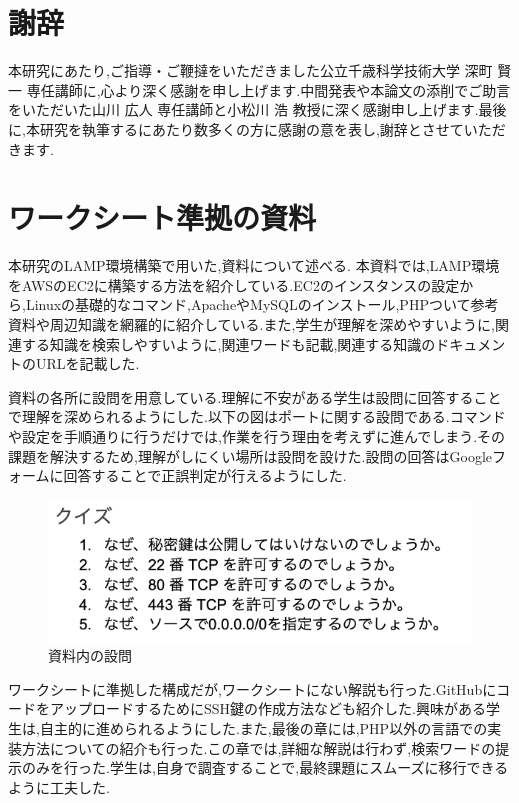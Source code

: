 \documentclass[11pt, a4paper]{jreport}
\begin{document}
\chapter*{謝辞}


本研究にあたり,ご指導・ご鞭撻をいただきました公立千歳科学技術大学 深町 賢一 専任講師に,心より深く感謝を申し上げます.中間発表や本論文の添削でご助言をいただいた山川 広人 専任講師と小松川 浩 教授に深く感謝申し上げます.最後に,本研究を執筆するにあたり数多くの方に感謝の意を表し,謝辞とさせていただきます.

\appendix
\chapter{ワークシート準拠の資料}\label{append_worksheet}
\renewcommand{\thepage}{A--\arabic{page}}

本研究のLAMP環境構築で用いた,資料について述べる. 本資料では,LAMP環境をAWSのEC2に構築する方法を紹介している.EC2のインスタンスの設定から,Linuxの基礎的なコマンド,ApacheやMySQLのインストール,PHPついて参考資料や周辺知識を網羅的に紹介している.また,学生が理解を深めやすいように,関連する知識を検索しやすいように,関連ワードも記載,関連する知識のドキュメントのURLを記載した.

資料の各所に設問を用意している.理解に不安がある学生は設問に回答することで理解を深められるようにした.以下の図はポートに関する設問である.コマンドや設定を手順通りに行うだけでは,作業を行う理由を考えずに進んでしまう.その課題を解決するため,理解がしにくい場所は設問を設けた.設問の回答はGoogleフォームに回答することで正誤判定が行えるようにした.

\begin{figure}[H]
\begin{center}
\includegraphics[width=140mm]{./img/question.png}
\caption{資料内の設問}
\label{fig:append_grech_config}
\end{center}
\end{figure}

ワークシートに準拠した構成だが,ワークシートにない解説も行った.GitHubにコードをアップロードするためにSSH鍵の作成方法なども紹介した.興味がある学生は,自主的に進められるようにした.また,最後の章には,PHP以外の言語での実装方法についての紹介も行った.この章では,詳細な解説は行わず,検索ワードの提示のみを行った.学生は,自身で調査することで,最終課題にスムーズに移行できるように工夫した.
\end{document}

